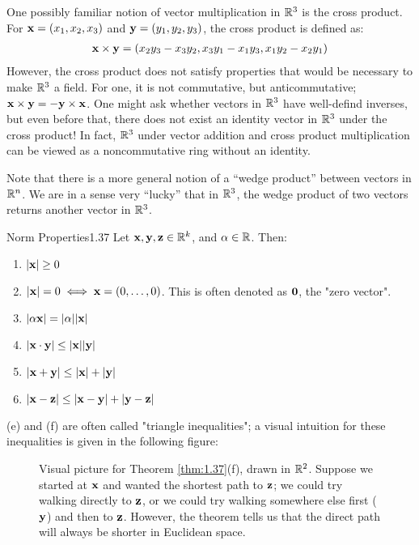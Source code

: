 One possibly familiar notion of vector multiplication in $\mathbb{R}^3$ is the cross product. For $\mathbf{x} = (x_1, x_2, x_3)$ and $\mathbf{y} = (y_1, y_2, y_3)$, the cross product is defined as:
\begin{align*}
    \mathbf{x} \times \mathbf{y} = (x_2y_3 - x_3y_2, x_3y_1 - x_1y_3, x_1y_2 - x_2y_1)
\end{align*}
However, the cross product does not satisfy properties that would be necessary to make $\mathbb{R}^3$ a field. For one, it is not commutative, but anticommutative; $\mathbf{x} \times \mathbf{y} = -\mathbf{y} \times \mathbf{x}$. One might ask whether vectors in $\mathbb{R}^3$ have well-defind inverses, but even before that, there does not exist an identity vector in $\mathbb{R}^3$ under the cross product! In fact, $\mathbb{R}^3$ under vector addition and cross product multiplication can be viewed as a noncommutative ring without an identity. 

Note that there is a more general notion of a ``wedge product'' between vectors in $\mathbb{R}^n$. We are in a sense very ``lucky'' that in $\mathbb{R}^3$, the wedge product of two vectors returns another vector in $\mathbb{R}^3$. 

\begin{theorem}{Norm Properties}{1.37}
    Let $\mathbf{x}, \mathbf{y}, \mathbf{z} \in \mathbb{R}^k$, and $\alpha \in \mathbb{R}$. Then:
    \begin{enumerate}
        \item $\abs{\mathbf{x}} \geq 0$
        \item $\abs{\mathbf{x}} = 0 \iff \mathbf{x} = (0, \ldots, 0)$. This is often denoted as $\mathbf{0}$, the "zero vector". 
        \item $\abs{\alpha\mathbf{x}} = \abs{\alpha}\abs{\mathbf{x}}$
        \item $\abs{\mathbf{x} \cdot \mathbf{y}} \leq \abs{\mathbf{x}}\abs{\mathbf{y}}$ 
        \item $\abs{\mathbf{x} + \mathbf{y}} \leq \abs{\mathbf{x}} + \abs{\mathbf{y}}$
        \item $\abs{\mathbf{x} - \mathbf{z}} \leq \abs{\mathbf{x} - \mathbf{y}} + \abs{\mathbf{y} - \mathbf{z}}$
    \end{enumerate}
\end{theorem}
\noindent (e) and (f) are often called "triangle inequalities"; a visual intuition for these inequalities is given in the following figure:
\begin{figure}[htbp]
    \centering
    \caption{Visual picture for Theorem \ref{thm:1.37}(f), drawn in $\mathbb{R}^2$. Suppose we started at $\mathbf{x}$ and wanted the shortest path to $\mathbf{z}$; we could try walking directly to $\mathbf{z}$, or we could try walking somewhere else first ($\mathbf{y}$) and then to $\mathbf{z}$. However, the theorem tells us that the direct path will always be shorter in Euclidean space.}
    \label{fig3}
\end{figure}

